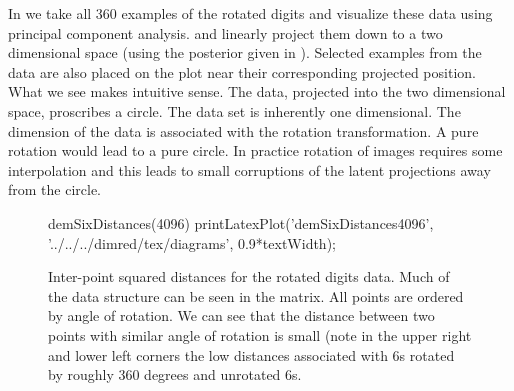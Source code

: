 In  we take all 360 examples of the rotated
digits and visualize these data using principal component analysis.
and linearly project them down to a two dimensional space (using the
posterior given in ). Selected examples from
the data are also placed on the plot near their corresponding
projected position. What we see makes intuitive sense. The data,
projected into the two dimensional space, proscribes a circle. The
data set is inherently one dimensional. The dimension of the data is
associated with the rotation transformation. A pure rotation would
lead to a pure circle. In practice rotation of images requires some
interpolation and this leads to small corruptions of the latent
projections away from the circle.
\begin{figure}
  \begin{octave}
    demSixDistances(4096)
    printLatexPlot('demSixDistances4096', '../../../dimred/tex/diagrams', 0.9*textWidth);
  \end{octave}
  \begin{center}
    
  \end{center}
  \caption{Inter-point squared distances for the rotated digits data. Much of the
    data structure can be seen in the matrix. All points are ordered by
    angle of rotation. We can see that the distance between two points
    with similar angle of rotation is small (note in the upper right and
    lower left corners the low distances associated with 6s rotated by
    roughly 360 degrees and unrotated 6s.}\label{fig:sixDistances4096}
\end{figure}
